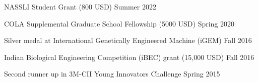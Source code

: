 NASSLI Student Grant (800 USD) \hfill Summer 2022

COLA Supplemental Graduate School Fellowship (5000 USD) \hfill Spring 2020

Silver medal at International Genetically Engineered Machine (iGEM) \hfill Fall 2016

Indian Biological Engineering Competition (iBEC) grant (15,000 USD) \hfill Fall 2016

Second runner up in 3M-CII Young Innovators Challenge \hfill Spring 2015

